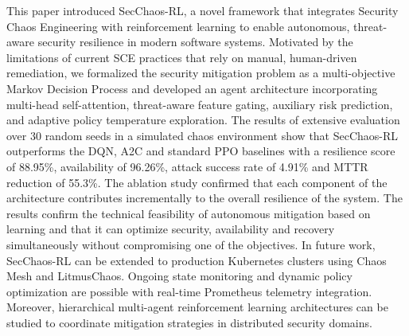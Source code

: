 \documentclass[conference,10pt]{IEEEtran}
\begin{document}
	This paper introduced SecChaos-RL, a novel framework that integrates Security Chaos Engineering with reinforcement learning to enable autonomous, threat-aware security resilience in modern software systems. Motivated by the limitations of current SCE practices that rely on manual, human-driven remediation, we formalized the security mitigation problem as a multi-objective Markov Decision Process and developed an agent architecture incorporating multi-head self-attention, threat-aware feature gating, auxiliary risk prediction, and adaptive policy temperature exploration.
	The results of extensive evaluation over 30 random seeds in a simulated chaos environment show that SecChaos-RL outperforms the DQN, A2C and standard PPO baselines with a resilience score of 88.95\%, availability of 96.26\%, attack success rate of 4.91\% and MTTR reduction of 55.3\%. The ablation study confirmed that each component of the architecture contributes incrementally to the overall resilience of the system. The results confirm the technical feasibility of autonomous mitigation based on learning and that it can optimize security, availability and recovery simultaneously without compromising one of the objectives. 
In future work, SecChaos-RL can be extended to production Kubernetes clusters using Chaos Mesh and LitmusChaos. Ongoing state monitoring and dynamic policy optimization are possible with real-time Prometheus telemetry integration. Moreover, hierarchical multi-agent reinforcement learning architectures can be studied to coordinate mitigation strategies in distributed security domains.


\end{document}
